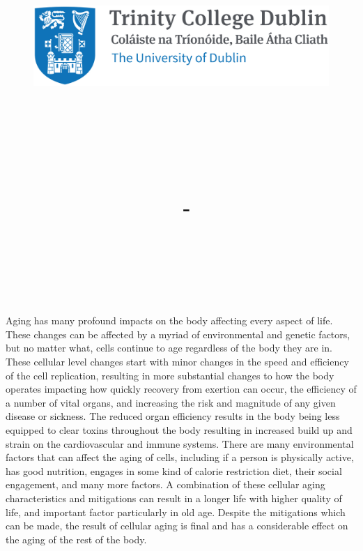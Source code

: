 \documentclass{article}
\title{
    \vspace{-1in}
    \begin{figure}[!ht]
    \flushleft
    \includegraphics[width=0.4\linewidth]{reduced-trinity.png}
    \end{figure}
    \vspace{-0.5cm}
    \hrulefill \\
    \vspace{1cm}
    \textmd{\textbf{\moduleCode\ \moduleName}}\\
    \textmd{\textbf{\assignmentTitle}}\\
    \textmd{\authorName\ - \authorID}\\
    \textmd{\reportDate}\\
    \vspace{0.5cm}
    \hrulefill \\
}
\date{}
\author{}
\begin{document}
    \lstset{language=bash, float=h, captionpos=b, frame=single, numbers=left, numberblanklines=false, numberstyle=\tiny, numbersep=1mm, framexleftmargin=3mm, xleftmargin=5mm, aboveskip=3mm, breaklines=true}
    \captionsetup{width=.8\linewidth} 

    \maketitle
    \newpage

Aging has many profound impacts on the body affecting every aspect of life. These changes can be affected by a myriad of environmental and genetic factors, but no matter what, cells continue to age regardless of the body they are in. These cellular level changes start with minor changes in the speed and efficiency of the cell replication, resulting in more substantial changes to how the body operates impacting how quickly recovery from exertion can occur, the efficiency of a number of vital organs, and increasing the risk and magnitude of any given disease or sickness. The reduced organ efficiency results in the body being less equipped to clear toxins throughout the body resulting in increased build up and strain on the cardiovascular and immune systems. There are many environmental factors that can affect the aging of cells, including if a person is physically active, has good nutrition, engages in some kind of calorie restriction diet, their social engagement, and many more factors. A combination of these cellular aging characteristics and mitigations can result in a longer life with higher quality of life, and important factor particularly in old age. Despite the mitigations which can be made, the result of cellular aging is final and has a considerable effect on the aging of the rest of the body.
\end{document}
